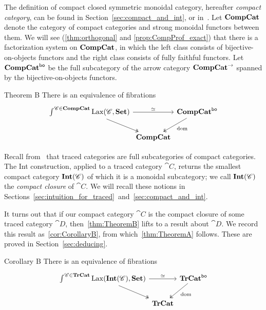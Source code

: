 \documentclass[12pt,oneside,article,draft]{memoir}
\begin{document}
The definition of compact closed symmetric
monoidal category, hereafter \emph{compact category}, can be found in Section~\ref{sec:compact_and_int}, or in~\cite{MacLane}. Let $\mathbf{CompCat}$ denote the category of compact categories and strong
monoidal functors between them. We will see (\ref{thm:orthogonal} and \ref{prop:CompProf_exact}) that there is a
factorization system on $\mathbf{CompCat}$, in which the left class consists of bijective-on-objects
functors and the right class consists of fully faithful functors. Let $\mathbf{CompCat}^{\mathsf{bo}}$ be the full
subcategory of the arrow category $\mathbf{CompCat}^{\to}$ spanned by the bijective-on-objects functors.

\begin{named}{Theorem B}\label{thm:TheoremB}
   There is an equivalence of fibrations
   \begin{equation*}
      \begin{tikzcd}[column sep=0em]
         \int^{\cat{C}\in\CompCat}\Lax(\cat{C},\Set) \ar[rr,"\equiv"] \ar[dr,two heads]
            && \CompCat^{\bo} \ar[dl,two heads,"\dom"] \\
            & \CompCat &
      \end{tikzcd}
   \end{equation*}
\end{named}

Recall from~\cite{JoyalStreetVerity} that traced categories are full subcategories of compact
categories.  The Int construction, applied to a traced category $\cat{C}$, returns the smallest
compact category $\mathbf{Int}(\mathscr{C})$ of which it is a monoidal subcategory; we call $\mathbf{Int}(\mathscr{C})$ the
\emph{compact closure} of $\cat{C}$. We will recall these notions in Sections~\ref{sec:intuition_for_traced}~and~\ref{sec:compact_and_int}.

It turns out that if our compact category $\cat{C}$ is the compact closure of some traced category
$\cat{D}$, then~\ref{thm:TheoremB} lifts to a result about $\cat{D}$. We record this result
as~\ref{cor:CorollaryB}, from which~\ref{thm:TheoremA} follows. These are proved in
Section~\ref{sec:deducing}.

\begin{named}{Corollary B}\label{cor:CorollaryB}
   There is an equivalence of fibrations
   \begin{equation*}
      \begin{tikzcd}[column sep=0em]
         \int^{\cat{C}\in\TrCat}\Lax(\Int(\cat{C}),\Set) \ar[rr,"\equiv"] \ar[dr,two heads]
            && \TrCat^{\bo} \ar[dl,two heads,"\dom"] \\
            & \TrCat &
      \end{tikzcd}
   \end{equation*}
\end{named}
\end{document}

